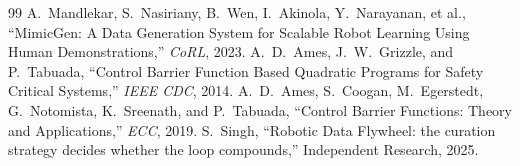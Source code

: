 \documentclass[conference,10pt]{IEEEtran}
\begin{document}
\begin{thebibliography}{99}
 A.~Mandlekar, S.~Nasiriany, B.~Wen, I.~Akinola, Y.~Narayanan, et al., ``MimicGen: A Data Generation System for Scalable Robot Learning Using Human Demonstrations,'' \emph{CoRL}, 2023.
 A.~D.~Ames, J.~W.~Grizzle, and P.~Tabuada, ``Control Barrier Function Based Quadratic Programs for Safety Critical Systems,'' \emph{IEEE CDC}, 2014.
 A.~D.~Ames, S.~Coogan, M.~Egerstedt, G.~Notomista, K.~Sreenath, and P.~Tabuada, ``Control Barrier Functions: Theory and Applications,'' \emph{ECC}, 2019.
 S.~Singh, ``Robotic Data Flywheel: the curation strategy decides whether the loop compounds,'' Independent Research, 2025.
\end{thebibliography}
\end{document}
